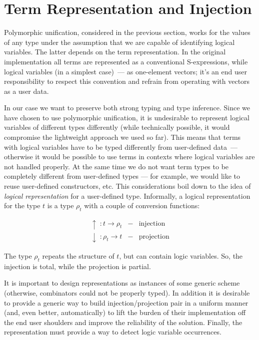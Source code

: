 \section{Term Representation and Injection}
\label{sec:injection}

Polymorphic unification, considered in the previous section, works for the values of any type under the assumption that we
are capable of identifying logical variables. The latter depends on the term representation. In the original
implementation all terms are represented as a conventional S-expressions, while logical variables (in a simplest case)~--- as one-element vectors; it's an end user responsibility to respect this convention and refrain from operating
with vectors as a user data.

In our case we want to preserve both strong typing and type inference. Since we have chosen to use polymorphic
unification, it is undesirable to represent logical variables of different types differently (while technically
possible, it would compromise the lightweight approach we used so far). This means that terms with logical
variables have to be typed differently from user-defined data~--- otherwise it would be possible to use
terms in contexts where logical variables are not handled properly. At the same time we do not want term types
to be completely different from user-defined types --- for example, we would like to reuse user-defined constructors, etc.
This considerations boil down to the idea of \emph{logical representation} for a user-defined type. Informally,
a logical representation for the type $t$ is a type $\rho_t$ with a couple of conversion functions:

$$
\begin{array}{rcl}
   \uparrow  \;: t \to \rho_t & - & \mbox{injection}\\
   \downarrow\;: \rho_t \to t & - & \mbox{projection}
\end{array}
$$

The type $\rho_t$ repeats the structure of $t$, but can contain logic variables. So, the injection is total,
while the projection is partial.

It is important to design representations as instances of some generic scheme (otherwise, \miniKanren combinators
could not be properly typed). In addition it is desirable to provide a generic way to build
injection/projection pair in a uniform manner (and, even better, automatically) to lift the burden of
their implementation off the end user shoulders and improve the reliability of the solution. Finally,
the representation must provide a way to detect logic variable occurrences.


